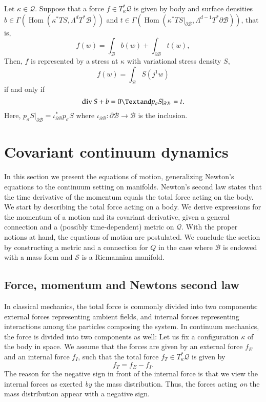 \documentclass[smallextended]{svjour3}
\begin{document}
Let $\kappa\in{\mathcal{Q}}$. Suppose that a force $f\in T^*_\kappa{\mathcal{Q}}$ is given by body and surface densities $b\in \Gamma({\operatorname{Hom}}({\kappa^*TS},\Lambda^dT^*{\mathcal{B}}))$ and $t\in\Gamma({\operatorname{Hom}}({\kappa^*TS}|_{\partial{\mathcal{B}}},\Lambda^{d-1}T^*\partial{\mathcal{B}}))$, that is, 
\[
f(w)=
\int_{\mathcal{B}} b(w) +
\int_{\partial{\mathcal{B}}} t(w),
\]
Then, $f$ is represented by a stress at $\kappa$ with variational stress density $S$,
\[
f(w) = \int_{\mathcal{B}} S(j^1 w)
\]
if and only if 
\[
\operatorname{div} S + b=0 
\Textand  
p_\sigma S|_{\partial{\mathcal{B}}}=t.
\]
Here, $p_\sigma S|_{\partial{\mathcal{B}}}=\iota_{\partial{\mathcal{B}}}^*p_\sigma S$ where $\iota_{\partial{\mathcal{B}}}:\partial{\mathcal{B}}\to{\mathcal{B}}$ is the inclusion.

\section{Covariant continuum dynamics} 
\label{sec:covariant_continuum_dynamics}

In this section we present the equations of motion, generalizing Newton's equations to the continuum setting on manifolds. Newton's second law states that the time derivative of the momentum equals the total force acting on the body.  We  start by describing the total force acting on a body. We derive expressions for the momentum of a motion and its covariant derivative, given a general connection and a (possibly time-dependent) metric on ${\mathcal{Q}}$. With the proper notions at hand, the equations of motion are postulated. We conclude the section by constructing a metric and a connection for $Q$ in the case where ${\mathcal{B}}$ is endowed with a mass form and ${\mathcal{S}}$ is a Riemannian manifold. 

\subsection{Force, momentum and Newtons second law}
\label{sec:force}

In classical mechanics, the total force is commonly divided into two components: external forces representing ambient  fields, and internal forces representing interactions among the particles composing the system. In continuum mechanics, the force is divided into two components as well:
Let us fix a configuration $\kappa$ of the body in space. We assume that the forces are given by an external force $f_E$ and an internal force $f_I$, such that the total force $f_T\in T^*_\kappa{\mathcal{Q}}$ is given by
\[
f_T=f_E-f_I.
\]
The reason for the negative sign in front of the internal force is that we view the internal forces as exerted \emph{by} the mass distribution. Thus, the forces acting \emph{on} the mass distribution appear with a negative sign.
\end{document}
